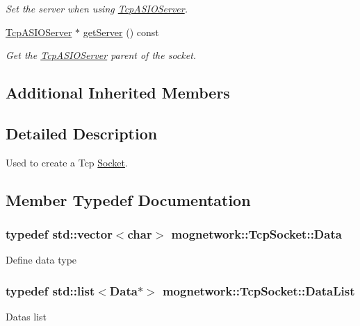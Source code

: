 \begin{DoxyCompactItemize}
\begin{DoxyCompactList}\small\item\em Set the server when using \hyperlink{classmognetwork_1_1_tcp_a_s_i_o_server}{Tcp\-A\-S\-I\-O\-Server}. \end{DoxyCompactList}\item 
\hyperlink{classmognetwork_1_1_tcp_a_s_i_o_server}{Tcp\-A\-S\-I\-O\-Server} $\ast$ \hyperlink{classmognetwork_1_1_tcp_socket_ab07f10a9f78168c051e7429e7f45a95f}{get\-Server} () const 
\begin{DoxyCompactList}\small\item\em Get the \hyperlink{classmognetwork_1_1_tcp_a_s_i_o_server}{Tcp\-A\-S\-I\-O\-Server} parent of the socket. \end{DoxyCompactList}\end{DoxyCompactItemize}
\subsection*{Additional Inherited Members}


\subsection{Detailed Description}
Used to create a Tcp \hyperlink{classmognetwork_1_1_socket}{Socket}. 

\subsection{Member Typedef Documentation}
\hypertarget{classmognetwork_1_1_tcp_socket_aa80d910649a16cedb6c98297e5893ed1}{
\subsubsection[{Data}]{\setlength{\rightskip}{0pt plus 5cm}typedef std\-::vector$<$char$>$ {\bf mognetwork\-::\-Tcp\-Socket\-::\-Data}}}\label{classmognetwork_1_1_tcp_socket_aa80d910649a16cedb6c98297e5893ed1}
Define data type \hypertarget{classmognetwork_1_1_tcp_socket_acd1726904d918e617c84eaf198196506}{
\subsubsection[{Data\-List}]{\setlength{\rightskip}{0pt plus 5cm}typedef std\-::list$<${\bf Data}$\ast$$>$ {\bf mognetwork\-::\-Tcp\-Socket\-::\-Data\-List}}}\label{classmognetwork_1_1_tcp_socket_acd1726904d918e617c84eaf198196506}
Datas list 

